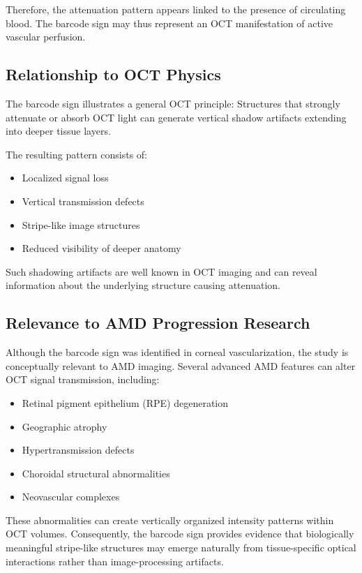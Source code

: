 \documentclass[11pt]{article}
\begin{document}
Therefore, the attenuation pattern appears linked to the presence of circulating blood.
The barcode sign may thus represent an OCT manifestation of active vascular perfusion.

\subsection*{Relationship to OCT Physics}

The barcode sign illustrates a general OCT principle: Structures that strongly attenuate or absorb OCT light can generate vertical shadow artifacts extending into deeper tissue layers.

The resulting pattern consists of:

\begin{itemize}
    \item Localized signal loss
    \item Vertical transmission defects
    \item Stripe-like image structures
    \item Reduced visibility of deeper anatomy
\end{itemize}

Such shadowing artifacts are well known in OCT imaging and can reveal information about the underlying structure causing attenuation.

\subsection*{Relevance to AMD Progression Research}

Although the barcode sign was identified in corneal vascularization, the study is conceptually relevant to AMD imaging.
Several advanced AMD features can alter OCT signal transmission, including:

\begin{itemize}
    \item Retinal pigment epithelium (RPE) degeneration
    \item Geographic atrophy
    \item Hypertransmission defects
    \item Choroidal structural abnormalities
    \item Neovascular complexes
\end{itemize}

These abnormalities can create vertically organized intensity patterns within OCT volumes.
Consequently, the barcode sign provides evidence that biologically meaningful stripe-like structures may emerge naturally from tissue-specific optical interactions rather than image-processing artifacts.
\end{document}

